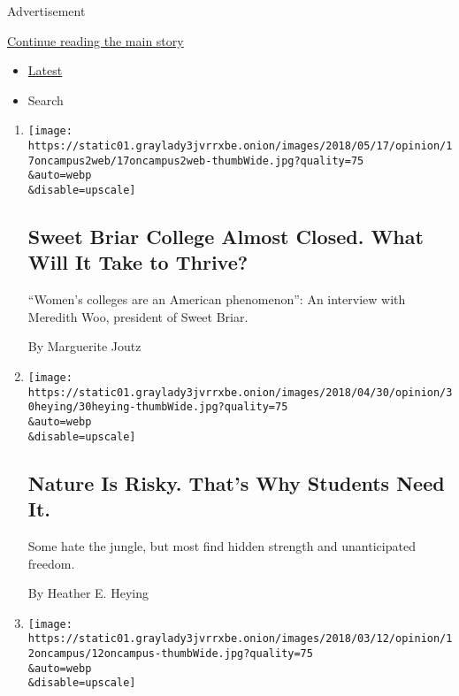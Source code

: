 Advertisement

\protect\hyperlink{after-mid1}{Continue reading the main story}

\begin{itemize}
\tightlist
\item
  \protect\hyperlink{stream-panel}{Latest}
\item
  Search
\end{itemize}

\begin{enumerate}
\def\labelenumi{\arabic{enumi}.}
\item
  \href{/2018/05/17/opinion/sweet-briar-meredith-woo-interview.html}{}

  \texttt{[image: https://static01.graylady3jvrrxbe.onion/images/2018/05/17/opinion/17oncampus2web/17oncampus2web-thumbWide.jpg?quality=75\\\&auto=webp\\\&disable=upscale]}

  \hypertarget{sweet-briar-college-almost-closed-what-will-it-take-to-thrive}{%
  \subsection{Sweet Briar College Almost Closed. What Will It Take to
  Thrive?}\label{sweet-briar-college-almost-closed-what-will-it-take-to-thrive}}

  ``Women's colleges are an American phenomenon'': An interview with
  Meredith Woo, president of Sweet Briar.

  By Marguerite Joutz
\item
  \href{/2018/04/30/opinion/nature-students-risk.html}{}

  \texttt{[image: https://static01.graylady3jvrrxbe.onion/images/2018/04/30/opinion/30heying/30heying-thumbWide.jpg?quality=75\\\&auto=webp\\\&disable=upscale]}

  \hypertarget{nature-is-risky-thats-why-students-need-it}{%
  \subsection{Nature Is Risky. That's Why Students Need
  It.}\label{nature-is-risky-thats-why-students-need-it}}

  Some hate the jungle, but most find hidden strength and unanticipated
  freedom.

  By Heather E. Heying
\item
  \href{/2018/03/12/opinion/back-to-school-at-64.html}{}

  \texttt{[image: https://static01.graylady3jvrrxbe.onion/images/2018/03/12/opinion/12oncampus/12oncampus-thumbWide.jpg?quality=75\\\&auto=webp\\\&disable=upscale]}


\end{enumerate}
